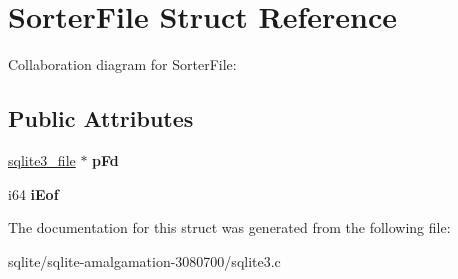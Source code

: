 \hypertarget{struct_sorter_file}{\section{Sorter\+File Struct Reference}
\label{struct_sorter_file}
}


Collaboration diagram for Sorter\+File\+:
\subsection*{Public Attributes}
\begin{DoxyCompactItemize}
\item 
\hypertarget{struct_sorter_file_afa23123282380b8d04b943479cabadef}{\hyperlink{structsqlite3__file}{sqlite3\+\_\+file} $\ast$ {\bfseries p\+Fd}}\label{struct_sorter_file_afa23123282380b8d04b943479cabadef}

\item 
\hypertarget{struct_sorter_file_a5c5f37fc8b5c432d8bf30eb6e40f7823}{i64 {\bfseries i\+Eof}}\label{struct_sorter_file_a5c5f37fc8b5c432d8bf30eb6e40f7823}

\end{DoxyCompactItemize}


The documentation for this struct was generated from the following file\+:\begin{DoxyCompactItemize}
\item 
sqlite/sqlite-\/amalgamation-\/3080700/sqlite3.\+c\end{DoxyCompactItemize}
